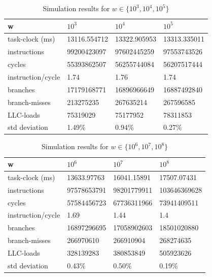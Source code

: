 \begin{table}[]
\centering
\begin{tabular}{|l|l|l|l|}
\hline
w                 & $10^3$       & $10^4$       & $10^5$       \\ \hline
task-clock (ms)   & 13116.554712 & 13322.905953 & 13313.335011 \\ \hline
instructions      & 99200423097  & 97602445259  & 97553743526  \\ \hline
cycles            & 55393862507  & 56255744084  & 56207517444  \\ \hline
instruction/cycle & 1.74         & 1.76         & 1.74         \\ \hline
branches          & 17179168771  & 16896966649  & 16887492840  \\ \hline
branch-misses     & 213275235    & 267635214    & 267596585    \\ \hline
LLC-loads         & 75319029     & 75177952     & 78311853     \\ \hline
std deviation     & 1.49\%       & 0.94\%       & 0.27\%       \\ \hline
\end{tabular}
\caption{Simulation results for $ w \in \{10^3, 10^4, 10^5\}$ }
\label{tab:res1}
\end{table}


\begin{table}[h]
\centering
\begin{tabular}{|l|l|l|l|}
\hline
w                 & $10^6$      & $10^7$      & $10^8$       \\ \hline
task-clock (ms)   & 13633.97763 & 16041.15891 & 17507.07431  \\ \hline
instructions      & 97578653791 & 98201779911 & 103646369628 \\ \hline
cycles            & 57584456723 & 67736311966 & 73941409511  \\ \hline
instruction/cycle & 1.69        & 1.44        & 1.4          \\ \hline
branches          & 16897296695 & 17058902603 & 18501020880  \\ \hline
branch-misses     & 266970610   & 266910904   & 268274635    \\ \hline
LLC-loads         & 328139283   & 380853849   & 505923626    \\ \hline
std deviation     & 0.43\%      & 0.50\%      & 0.19\%       \\ \hline
\end{tabular}%
\caption{Simulation results for $ w \in \{10^6, 10^7, 10^8\}$}
\label{tab:res2}
\end{table}


